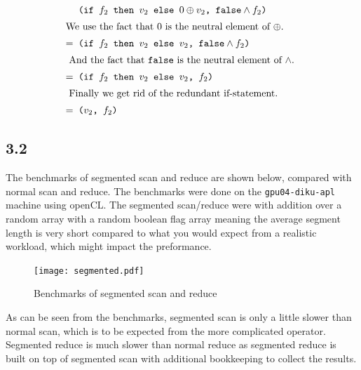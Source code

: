 \documentclass{article}
\begin{document}
\begin{align*}
     & \texttt{
        (if $f_2$ then $v_2$ else $0 \oplus v_2$, $\texttt{false} \wedge f_2$)
    }
    \\
    \intertext{We use the fact that $0$ is the neutral element of $\oplus$.}
    =& \texttt{
        (if $f_2$ then $v_2$ else $v_2$, $\texttt{false} \wedge f_2$)
    }
    \\
    \intertext{
        And the fact that \texttt{false} is the neutral element of $\wedge$.
    }
    =& \texttt{
        (if $f_2$ then $v_2$ else $v_2$, $f_2$)
    }
    \\
    \intertext{
        Finally we get rid of the redundant if-statement.
    }
    =& \texttt{
        ($v_2$, $f_2$)
    }
    \\
\end{align*}

\subsection*{3.2}

The benchmarks of segmented scan and reduce are shown below, compared with
normal scan and reduce. The benchmarks were done on the \verb|gpu04-diku-apl| machine
using openCL. The segmented scan/reduce were with addition over a random array
with a random boolean flag array meaning the average segment length is very short
compared to what you would expect from a realistic workload, which might impact
the preformance.

\begin{figure}
    \centering
    \texttt{[image: segmented.pdf]}
    \caption{Benchmarks of segmented scan and reduce}
\end{figure}

As can be seen from the benchmarks, segmented scan is only a little slower than
normal scan, which is to be expected from the more complicated operator.
Segmented reduce is much slower than normal reduce as segmented reduce is built
on top of segmented scan with additional bookkeeping to collect the results.
\end{document}
